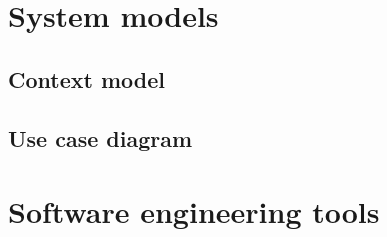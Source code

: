 \documentclass[letterpaper,article,oneside]{memoir}
\begin{document}
\renewcommand{\chapterheadstart}{\vspace{\beforechapskip}}

\chapter{System models}

\section{Context model}


\section{Use case diagram}


\newpage
\chapter{Software engineering tools}


\end{document}
